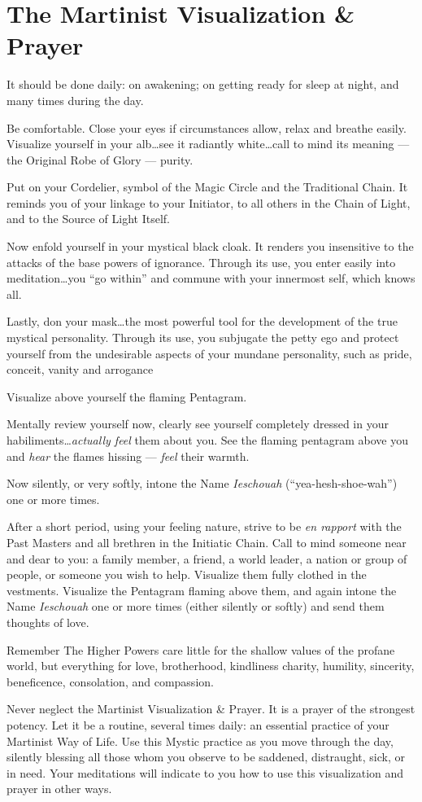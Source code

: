 \chapter{The Martinist Visualization \& Prayer}
It should be done daily: on awakening; on getting ready for sleep at night, and many
times during the day.

Be comfortable. Close your eyes if circumstances allow, relax and breathe easily. Visualize yourself in your alb\ldots see it radiantly white\ldots call to mind its meaning --- the Original Robe of Glory --- purity.

Put on your Cordelier, symbol of the Magic Circle and the Traditional Chain. It reminds you of your linkage to your Initiator, to all others in the Chain of Light, and to the Source of Light Itself.

Now enfold yourself in your mystical black cloak. It renders you insensitive to the attacks of the base powers of ignorance. Through its use, you enter easily into meditation\ldots you ``go within'' and commune with your innermost self, which knows all.

Lastly, don your mask\ldots the most powerful tool for the development of the true mystical personality. Through its use, you subjugate the petty ego and protect yourself from the undesirable aspects of your mundane personality, such as pride, conceit, vanity and arrogance

Visualize above yourself the flaming Pentagram.

Mentally review yourself now, clearly see yourself completely dressed in your habiliments\ldots \textit{actually feel} them about you. See the flaming pentagram above you and \textit{hear} the flames hissing --- \textit{feel} their warmth.

Now silently, or very softly, intone the Name \textit{Ieschouah} (``yea-hesh-shoe-wah'') one or more times.

After a short period, using your feeling nature, strive to be \textit{en rapport} with the Past Masters and all brethren in the Initiatic Chain. Call to mind someone near and dear to you: a family member, a friend, a world leader, a nation or group of people, or someone you wish to help. Visualize them fully clothed in the vestments. Visualize the Pentagram flaming above them, and again intone the Name \textit{Ieschouah} one or more times (either silently or softly) and send them thoughts of love.

\begin{paperbox}{Remember}
The Higher Powers care little for the shallow values of the profane world, but everything for love, brotherhood, kindliness charity, humility, sincerity, beneficence, consolation, and compassion.
\end{paperbox}

Never neglect the Martinist Visualization \& Prayer. It is a prayer of the strongest potency. Let it be a routine, several times daily: an essential practice of your Martinist Way of Life. Use this Mystic practice as you move through the day, silently blessing all those whom you observe to be saddened, distraught, sick, or in need. Your meditations will indicate to you how to use this visualization and prayer in other ways.